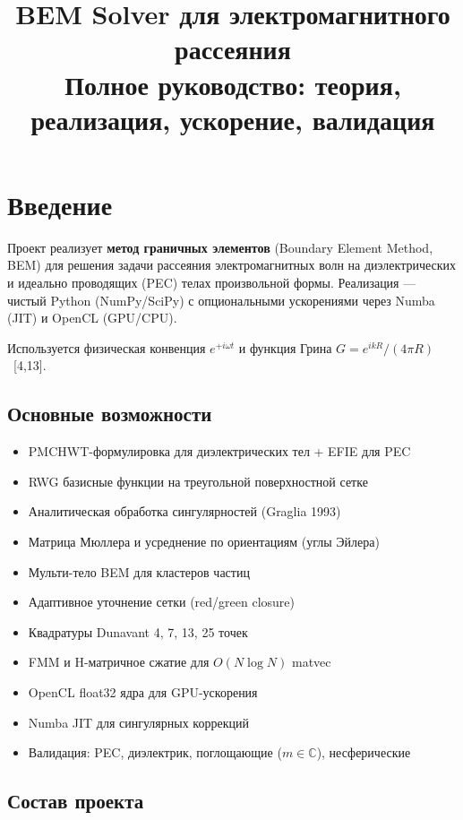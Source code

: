 \documentclass[12pt,a4paper]{article}
\title{\textbf{BEM Solver для электромагнитного рассеяния}\\[0.3em]
\large Полное руководство: теория, реализация, ускорение, валидация}
\author{}
\date{}
\begin{document}
\maketitle
\tableofcontents
\newpage

\section{Введение}

Проект реализует \textbf{метод граничных элементов} (Boundary Element Method, BEM) для решения задачи рассеяния электромагнитных волн на диэлектрических и идеально проводящих (PEC) телах произвольной формы. Реализация --- чистый Python (NumPy/SciPy) с опциональными ускорениями через Numba (JIT) и OpenCL (GPU/CPU).

Используется физическая конвенция $e^{+i\omega t}$ и функция Грина $G = e^{ikR}/(4\pi R)$~[4,13].

\subsection{Основные возможности}

\begin{itemize}
  \item PMCHWT-формулировка для диэлектрических тел + EFIE для PEC
  \item RWG базисные функции на треугольной поверхностной сетке
  \item Аналитическая обработка сингулярностей (Graglia 1993)
  \item Матрица Мюллера и усреднение по ориентациям (углы Эйлера)
  \item Мульти-тело BEM для кластеров частиц
  \item Адаптивное уточнение сетки (red/green closure)
  \item Квадратуры Dunavant 4, 7, 13, 25 точек
  \item FMM и H-матричное сжатие для $O(N \log N)$ matvec
  \item OpenCL float32 ядра для GPU-ускорения
  \item Numba JIT для сингулярных коррекций
  \item Валидация: PEC, диэлектрик, поглощающие ($m \in \mathbb{C}$), несферические
\end{itemize}

\subsection{Состав проекта}
\end{document}
